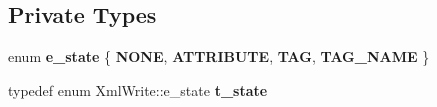 \subsection*{Private Types}
\begin{DoxyCompactItemize}
\item 
\hypertarget{class_xml_write_a1835614ff188743b88810d45a2fccc6a}{}enum {\bfseries e\+\_\+state} \{ {\bfseries N\+O\+N\+E}, 
{\bfseries A\+T\+T\+R\+I\+B\+U\+T\+E}, 
{\bfseries T\+A\+G}, 
{\bfseries T\+A\+G\+\_\+\+N\+A\+M\+E}
 \}\label{class_xml_write_a1835614ff188743b88810d45a2fccc6a}

\item 
\hypertarget{class_xml_write_a97dd59183c5b15cdd8d12b114dc65cf3}{}typedef enum Xml\+Write\+::e\+\_\+state {\bfseries t\+\_\+state}\label{class_xml_write_a97dd59183c5b15cdd8d12b114dc65cf3}

\end{DoxyCompactItemize}
